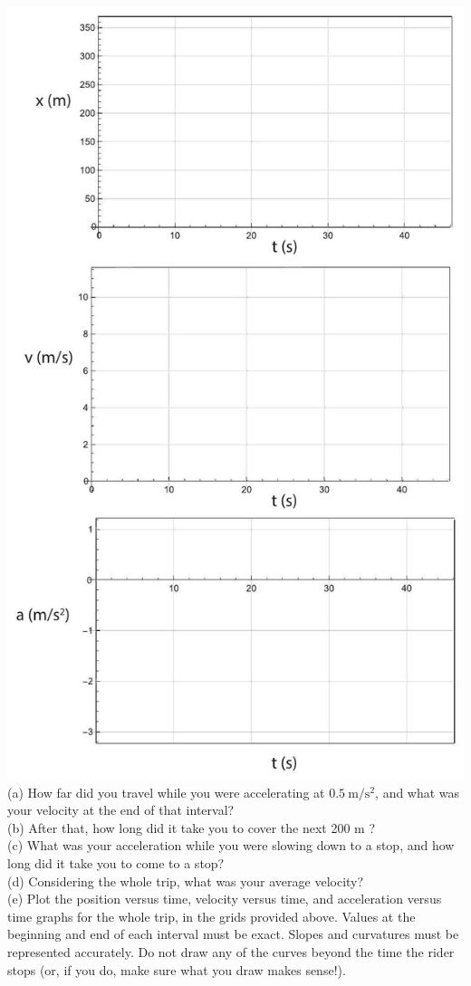\documentclass[10pt]{article}
\begin{document}
\includegraphics[max width=\textwidth, center]{2024_09_14_9969b06773f10b6936e8g-066}\\
(a) How far did you travel while you were accelerating at $0.5 \mathrm{~m} / \mathrm{s}^{2}$, and what was your velocity at the end of that interval?\\
(b) After that, how long did it take you to cover the next 200 m ?\\
(c) What was your acceleration while you were slowing down to a stop, and how long did it take you to come to a stop?\\
(d) Considering the whole trip, what was your average velocity?\\
(e) Plot the position versus time, velocity versus time, and acceleration versus time graphs for the whole trip, in the grids provided above. Values at the beginning and end of each interval must be exact. Slopes and curvatures must be represented accurately. Do not draw any of the curves beyond the time the rider stops (or, if you do, make sure what you draw makes sense!).
\end{document}
